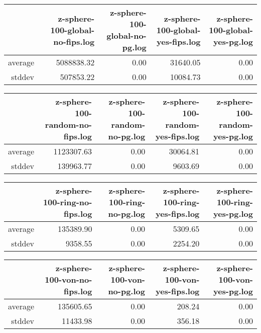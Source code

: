 \begin{table}[ht]
\centering
\begin{tabular}{rrrrr}
  \hline
 & z-sphere-100-global-no-fips.log & z-sphere-100-global-no-pg.log & z-sphere-100-global-yes-fips.log & z-sphere-100-global-yes-pg.log \\ 
  \hline
average & 5088838.32 & 0.00 & 31640.05 & 0.00 \\ 
  stddev & 507853.22 & 0.00 & 10084.73 & 0.00 \\ 
   \hline
\end{tabular}
\end{table}
\begin{table}[ht]
\centering
\begin{tabular}{rrrrr}
  \hline
 & z-sphere-100-random-no-fips.log & z-sphere-100-random-no-pg.log & z-sphere-100-random-yes-fips.log & z-sphere-100-random-yes-pg.log \\ 
  \hline
average & 1123307.63 & 0.00 & 30064.81 & 0.00 \\ 
  stddev & 139963.77 & 0.00 & 9603.69 & 0.00 \\ 
   \hline
\end{tabular}
\end{table}
\begin{table}[ht]
\centering
\begin{tabular}{rrrrr}
  \hline
 & z-sphere-100-ring-no-fips.log & z-sphere-100-ring-no-pg.log & z-sphere-100-ring-yes-fips.log & z-sphere-100-ring-yes-pg.log \\ 
  \hline
average & 135389.90 & 0.00 & 5309.65 & 0.00 \\ 
  stddev & 9358.55 & 0.00 & 2254.20 & 0.00 \\ 
   \hline
\end{tabular}
\end{table}
\begin{table}[ht]
\centering
\begin{tabular}{rrrrr}
  \hline
 & z-sphere-100-von-no-fips.log & z-sphere-100-von-no-pg.log & z-sphere-100-von-yes-fips.log & z-sphere-100-von-yes-pg.log \\ 
  \hline
average & 135605.65 & 0.00 & 208.24 & 0.00 \\ 
  stddev & 11433.98 & 0.00 & 356.18 & 0.00 \\ 
   \hline
\end{tabular}
\end{table}
